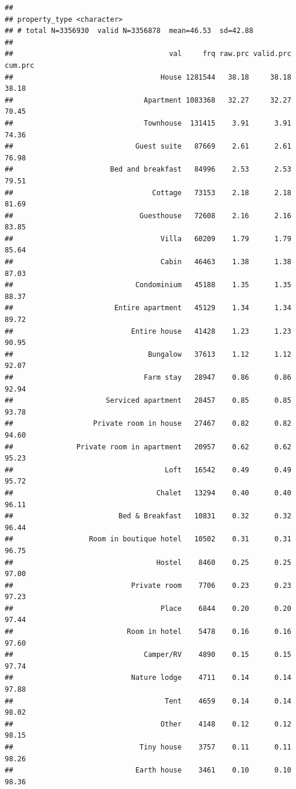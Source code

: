 \documentclass[]{article}
\begin{document}
\begin{verbatim}
## 
## property_type <character>
## # total N=3356930  valid N=3356878  mean=46.53  sd=42.88
## 
##                                     val     frq raw.prc valid.prc cum.prc
##                                   House 1281544   38.18     38.18   38.18
##                               Apartment 1083368   32.27     32.27   70.45
##                               Townhouse  131415    3.91      3.91   74.36
##                             Guest suite   87669    2.61      2.61   76.98
##                       Bed and breakfast   84996    2.53      2.53   79.51
##                                 Cottage   73153    2.18      2.18   81.69
##                              Guesthouse   72608    2.16      2.16   83.85
##                                   Villa   60209    1.79      1.79   85.64
##                                   Cabin   46463    1.38      1.38   87.03
##                             Condominium   45188    1.35      1.35   88.37
##                        Entire apartment   45129    1.34      1.34   89.72
##                            Entire house   41428    1.23      1.23   90.95
##                                Bungalow   37613    1.12      1.12   92.07
##                               Farm stay   28947    0.86      0.86   92.94
##                      Serviced apartment   28457    0.85      0.85   93.78
##                   Private room in house   27467    0.82      0.82   94.60
##               Private room in apartment   20957    0.62      0.62   95.23
##                                    Loft   16542    0.49      0.49   95.72
##                                  Chalet   13294    0.40      0.40   96.11
##                         Bed & Breakfast   10831    0.32      0.32   96.44
##                  Room in boutique hotel   10502    0.31      0.31   96.75
##                                  Hostel    8460    0.25      0.25   97.00
##                            Private room    7706    0.23      0.23   97.23
##                                   Place    6844    0.20      0.20   97.44
##                           Room in hotel    5478    0.16      0.16   97.60
##                               Camper/RV    4890    0.15      0.15   97.74
##                            Nature lodge    4711    0.14      0.14   97.88
##                                    Tent    4659    0.14      0.14   98.02
##                                   Other    4148    0.12      0.12   98.15
##                              Tiny house    3757    0.11      0.11   98.26
##                             Earth house    3461    0.10      0.10   98.36

\end{verbatim}
\end{document}
